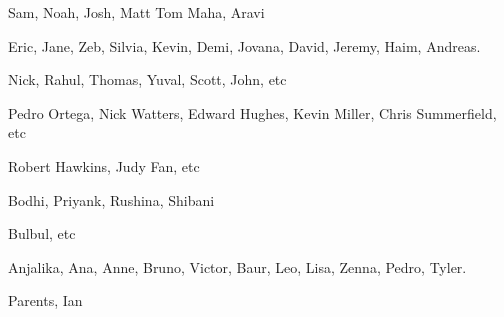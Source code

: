 
Sam, Noah, Josh, Matt
Tom
Maha, Aravi

Eric, Jane, Zeb, Silvia, Kevin, Demi, Jovana, David, Jeremy, Haim, Andreas.

Nick, Rahul, Thomas, Yuval, Scott, John, etc

Pedro Ortega, Nick Watters, Edward Hughes, Kevin Miller, Chris Summerfield, etc

Robert Hawkins, Judy Fan, etc

Bodhi, Priyank, Rushina, Shibani

Bulbul, etc

Anjalika, Ana, Anne, Bruno, Victor, Baur, Leo, Lisa, Zenna, Pedro, Tyler. 

Parents, Ian



